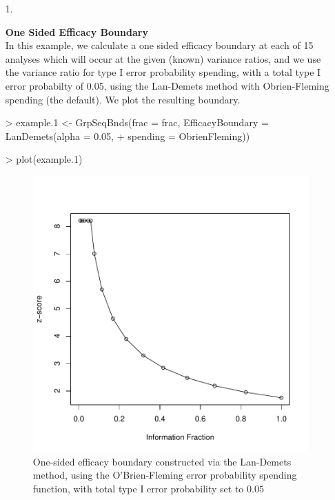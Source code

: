 \documentclass{article}
\begin{document}
\begin{itemize}
  \item[1.]{{\bf One Sided Efficacy Boundary}\\
    In this example, we calculate a one sided efficacy boundary at each of 15 analyses which
    will occur at the given (known) variance ratios, and we use the variance ratio for type I
    error probability spending, with a total type I error probabilty of 0.05, using the
    Lan-Demets method with Obrien-Fleming spending (the default). We plot the resulting boundary.
    
\begin{Schunk}
\begin{Sinput}
> example.1 <- GrpSeqBnds(frac = frac, EfficacyBoundary = LanDemets(alpha = 0.05, 
+     spending = ObrienFleming))
\end{Sinput}
\end{Schunk}

\begin{Schunk}
\begin{Sinput}
> plot(example.1)
\end{Sinput}
\end{Schunk}
  }

  \begin{figure}
  \begin{center}
\includegraphics{GrpSeqBnds-vignette-1-incl-ex1-plot}
  \end{center}
  \caption{One-sided efficacy boundary constructed via the Lan-Demets method,
    using the O'Brien-Fleming error probability spending function, with total
    type I error probability set to $0.05$}
  \label{fig:ex1}
  \end{figure}


\end{itemize}
\end{document}
